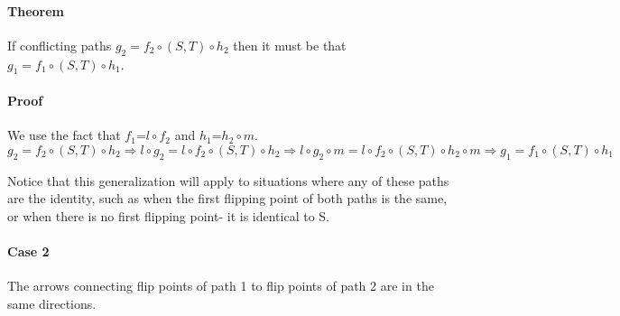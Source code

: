 \documentclass{article}
\begin{document}
\paragraph{Theorem} 
If conflicting paths $g_2 = f_2 \circ (S,T) \circ h_2$ then it must be that $g_1 = f_1 \circ (S,T) \circ h_1$.
\paragraph{Proof}
We use the fact that $f_1$=$l\circ f_2$ and $h_1$=$h_2 \circ m$.
\[g_2 = f_2 \circ (S,T) \circ h_2 \Rightarrow l \circ g_2 = l \circ f_2 \circ (S,T) \circ h_2 \Rightarrow l \circ g_2 \circ m = l \circ f_2 \circ (S,T) \circ h_2 \circ m \Rightarrow g_1 = f_1 \circ (S,T) \circ h_1\]


Notice that this generalization will apply to situations where any of these paths are the identity, such as when the first flipping point of both paths is the same, or when there is no first flipping point- it is identical to S.

\paragraph{Case 2} The arrows connecting flip points of path 1 to flip points of path 2 are in the same directions.
\end{document}
